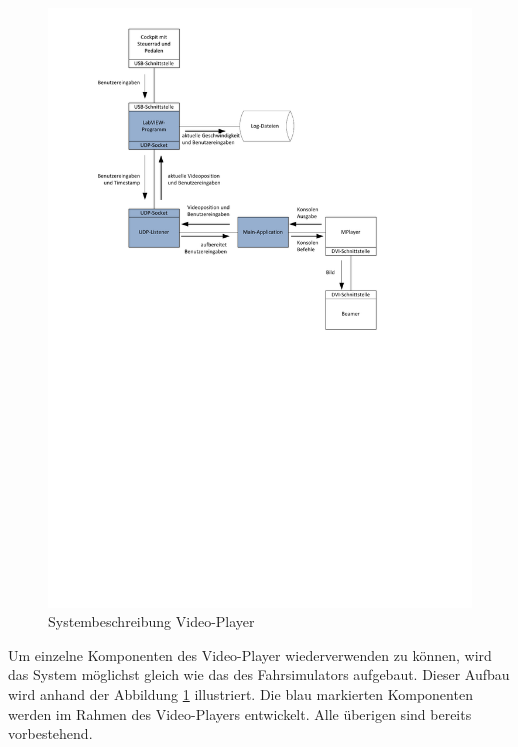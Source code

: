 \begin{figure}[H]
\centering 
\includegraphics{src/Systembeschreibung_VideoPlayer.pdf}
\caption{Systembeschreibung Video-Player} %
\label{Systembeschreibung Video-Player} %
\end{figure}
Um einzelne Komponenten des Video-Player wiederverwenden zu können, wird das System möglichst gleich wie das des Fahrsimulators aufgebaut. Dieser Aufbau wird anhand der Abbildung \ref{Systembeschreibung Video-Player} illustriert.  Die blau markierten Komponenten werden im Rahmen des Video-Players entwickelt. Alle überigen sind bereits vorbestehend. \\
